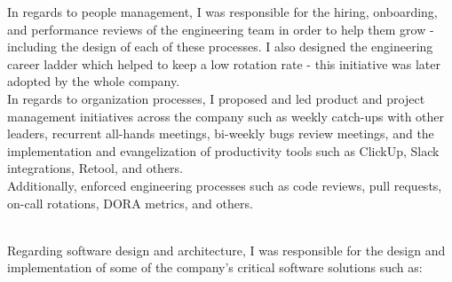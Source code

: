 \documentclass[9pt]{developercv} %
\begin{document}
\begin{entrylist}
{            In regards to people management, I was responsible for the hiring, onboarding, and
            performance reviews of the engineering team in order to help them grow - including 
            the design of each of these processes. I also designed the engineering career ladder 
            which helped to keep a low rotation rate - this initiative was later adopted by the 
            whole company.\\

            In regards to organization processes, I proposed and led product and project 
            management initiatives across the company such as weekly catch-ups with other leaders, 
            recurrent all-hands meetings, bi-weekly bugs review meetings, and the implementation and 
            evangelization of productivity tools such as ClickUp, Slack integrations, Retool, 
            and others. \\

            Additionally, enforced engineering processes such as code reviews, pull requests, 
            on-call rotations, DORA metrics, and others.
        }

    \entry
        {}
        {}
        {}
        {\\
            Regarding software design and architecture, I was responsible for the design and
            implementation of some of the company's critical software solutions such as:

}
\end{entrylist}
\end{document}

